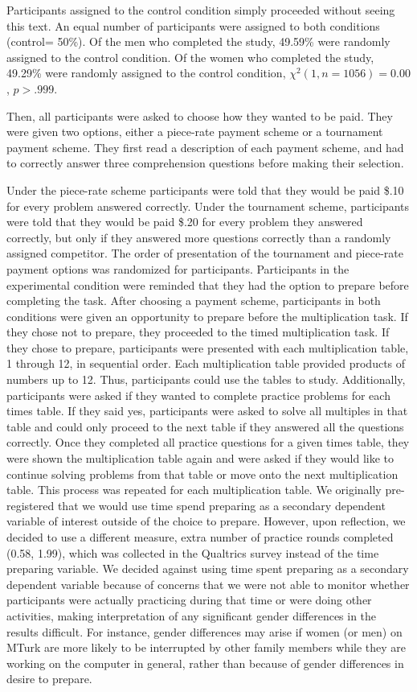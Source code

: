\documentclass[a4paper,nobind]{templates/ociamthesis}
\begin{document}
Participants assigned to the control condition simply proceeded without seeing this text. An equal number of participants were assigned to both conditions (control= 50\%). Of the men who completed the study, 49.59\% were randomly assigned to the control condition. Of the women who completed the study, 49.29\% were randomly assigned to the control condition, \(\chi^2(1, n = 1056) = 0.00\), \(p > .999\).

Then, all participants were asked to choose how they wanted to be paid. They were given two options, either a piece-rate payment scheme or a tournament payment scheme. They first read a description of each payment scheme, and had to correctly answer three comprehension questions before making their selection.

Under the piece-rate scheme participants were told that they would be paid \$.10 for every problem answered correctly. Under the tournament scheme, participants were told that they would be paid \$.20 for every problem they answered correctly, but only if they answered more questions correctly than a randomly assigned competitor. The order of presentation of the tournament and piece-rate payment options was randomized for participants. Participants in the experimental condition were reminded that they had the option to prepare before completing the task. After choosing a payment scheme, participants in both conditions were given an opportunity to prepare before the multiplication task. If they chose not to prepare, they proceeded to the timed multiplication task. If they chose to prepare, participants were presented with each multiplication table, 1 through 12, in sequential order. Each multiplication table provided products of numbers up to 12. Thus, participants could use the tables to study. Additionally, participants were asked if they wanted to complete practice problems for each times table. If they said yes, participants were asked to solve all multiples in that table and could only proceed to the next table if they answered all the questions correctly. Once they completed all practice questions for a given times table, they were shown the multiplication table again and were asked if they would like to continue solving problems from that table or move onto the next multiplication table. This process was repeated for each multiplication table. We originally pre-registered that we would use time spend preparing as a secondary dependent variable of interest outside of the choice to prepare. However, upon reflection, we decided to use a different measure, extra number of practice rounds completed (0.58, 1.99), which was collected in the Qualtrics survey instead of the time preparing variable. We decided against using time spent preparing as a secondary dependent variable because of concerns that we were not able to monitor whether participants were actually practicing during that time or were doing other activities, making interpretation of any significant gender differences in the results difficult. For instance, gender differences may arise if women (or men) on MTurk are more likely to be interrupted by other family members while they are working on the computer in general, rather than because of gender differences in desire to prepare. 
\end{document}
